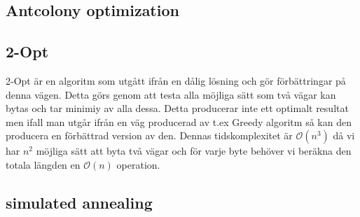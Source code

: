 \documentclass[conference]{IEEEtran}
\begin{document}
\subsection{Antcolony optimization}
\subsection{2-Opt}
2-Opt är en algoritm som utgått ifrån en dålig lösning och gör förbättringar på denna vägen. Detta görs genom att testa alla möjliga sätt som två vägar kan bytas och tar minimiy av alla dessa. Detta producerar inte ett optimalt resultat men ifall man utgår ifrån en väg producerad av t.ex Greedy algoritm så kan den producera en förbättrad version av den. Dennas tidskomplexitet är $\mathcal{O}(n^3)$ då vi har $n^2$ möjliga sätt att byta två vägar och för varje byte behöver vi beräkna den totala längden en $\mathcal{O}(n)$ operation.
\subsection{simulated annealing}
\end{document}
